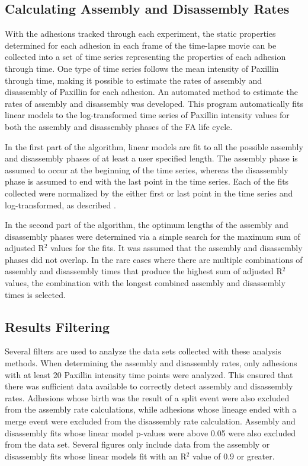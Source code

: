 \documentclass[10pt]{article}
\begin{document}
\subsection*{Calculating Assembly and Disassembly Rates}

With the adhesions tracked through each experiment, the static properties
determined for each adhesion in each frame of the time-lapse movie can be
collected into a set of time series representing the properties of each adhesion
through time. One type of time series follows the mean intensity of Paxillin
through time, making it possible to estimate the rates of assembly and
disassembly of Paxillin for each adhesion. An automated method to estimate the
rates of assembly and disassembly was developed. This program automatically fits
linear models to the log-transformed time series of Paxillin intensity values
for both the assembly and disassembly phases of the FA life cycle. 

In the first part of the algorithm, linear models are fit to all the possible
assembly and disassembly phases of at least a user specified length. The
assembly phase is assumed to occur at the beginning of the time series, whereas
the disassembly phase is assumed to end with the last point in the time series.
Each of the fits collected were normalized by the either first or last point in
the time series and log-transformed, as described \cite{Webb2004}.

In the second part of the algorithm, the optimum lengths of the assembly and
disassembly phases were determined via a simple search for the maximum sum of
adjusted R$^2$ values for the fits. It was assumed that the assembly and
disassembly phases did not overlap. In the rare cases where there are multiple
combinations of assembly and disassembly times that produce the highest sum of
adjusted R$^2$ values, the combination with the longest combined assembly and
disassembly times is selected.

\subsection*{Results Filtering}

Several filters are used to analyze the data sets collected with these analysis
methods. When determining the assembly and disassembly rates, only adhesions
with at least 20 Paxillin intensity time points were analyzed. This ensured that
there was sufficient data available to correctly detect assembly and disassembly
rates. Adhesions whose birth was the result of a split event were also excluded
from the assembly rate calculations, while adhesions whose lineage ended with a
merge event were excluded from the disassembly rate calculation. Assembly and
disassembly fits whose linear model p-values were above 0.05 were also excluded
from the data set. Several figures only include data from the assembly or
disassembly fits whose linear models fit with an R$^2$ value of 0.9 or greater.
\end{document}
